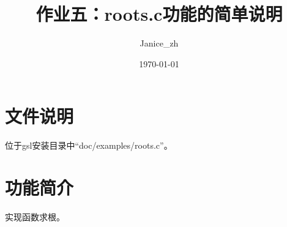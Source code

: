 \documentclass{article}
\title{作业五：roots.c功能的简单说明}
\author{Janice\_zh}
\date{\today}
\begin{document}
	\maketitle   %
	\section{文件说明}
	位于gsl安装目录中``doc/examples/roots.c''。
	\section{功能简介}
	实现函数求根。
	
	
	 
	           
	           
\end{document}
